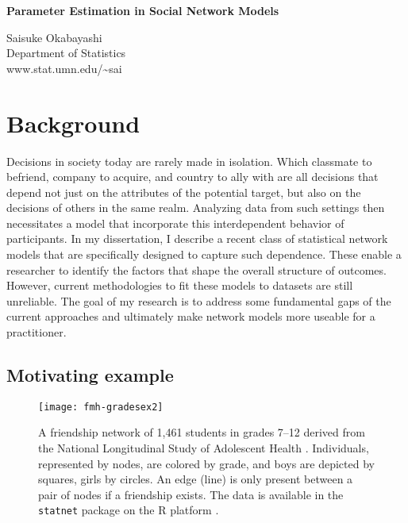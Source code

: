 \documentclass[12pt]{article}
\begin{document}
\begin{center}
{\large{\textbf{Parameter Estimation in Social Network Models}}} 

\vspace{0.15in}
{Saisuke Okabayashi} \\
{Department of Statistics}\\
www.stat.umn.edu/\textasciitilde sai
\end{center}


\section{Background}
Decisions in society today are rarely made in isolation.  Which classmate 
to befriend, company to acquire, and 
country to ally with are all decisions that depend not just on the 
attributes of the potential target, but also on the decisions of others 
in the same realm.  Analyzing
data from such settings then necessitates a model that incorporate 
this interdependent behavior of participants.  
In my dissertation, I describe a recent class of statistical network models 
that are specifically designed to capture such dependence.
These enable a researcher to identify the 
factors that shape the overall structure 
of outcomes.  However, current methodologies to fit these models to datasets
are still unreliable. 
The goal of my research is to address some fundamental gaps of 
the current approaches and ultimately make network models more useable for a practitioner.


\subsection{Motivating example}
\begin{figure}[h!]
\centering
\texttt{[image: fmh-gradesex2]}
\caption{A friendship network of 1,461 students in grades 7--12 derived 
from the National Longitudinal Study of Adolescent Health \citep{Resnick:1997}.  
Individuals, represented by nodes, are colored by grade, and boys
are depicted by squares, girls by circles.  An edge (line) is only present between a pair of 
nodes if a friendship exists.  The data is available in the 
\texttt{statnet} package \citep{statnet:R} on the R platform \citep{R}.}
\label{F:fmh}
\end{figure}
\end{document}
